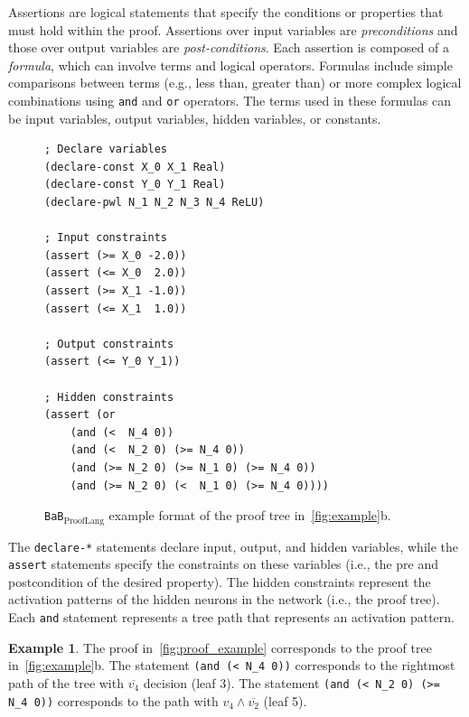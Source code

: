\documentclass[oneside,11pt,dvipsnames]{book}
\numberwithin{equation}{section}
\theoremstyle{definition}
\newtheorem{example}{Example}[section]
\theoremstyle{remark}
\newcommand{\functiontextformat}[1]{\textrm{\texttt{#1}}}
\newcommand{\tvn}[1]{\iftoggle{usecomment}{{\color{red}{[TVN]: #1}}}{}}
\newcommand{\hd}[1]{\iftoggle{usecomment}{{\color{blue}{[HD]: #1}}}{}}
\newcommand{\prooflang}{\texttt{BaB$_{\text{ProofLang}}$}}
\begin{document}
Assertions are logical statements that specify the conditions or properties that must hold within the proof. Assertions over input variables are \emph{preconditions} and those over output variables are \emph{post-conditions}. Each assertion is composed of a \textit{formula}, which can involve terms and logical operators. Formulas include simple comparisons between terms (e.g., less than, greater than) or more complex logical combinations using \functiontextformat{and} and \functiontextformat{or} operators. The terms used in these formulas can be input variables, output variables, hidden variables, or constants.

\begin{figure}
\begin{lstlisting}[style=SMTLIB-style, language=SMTLIB, basicstyle=\ttfamily\scriptsize]
; Declare variables
(declare-const X_0 X_1 Real)
(declare-const Y_0 Y_1 Real)
(declare-pwl N_1 N_2 N_3 N_4 ReLU)

; Input constraints
(assert (>= X_0 -2.0))
(assert (<= X_0  2.0))
(assert (>= X_1 -1.0))
(assert (<= X_1  1.0))

; Output constraints
(assert (<= Y_0 Y_1)) 

; Hidden constraints
(assert (or 
    (and (<  N_4 0))
    (and (<  N_2 0) (>= N_4 0))
    (and (>= N_2 0) (>= N_1 0) (>= N_4 0))
    (and (>= N_2 0) (<  N_1 0) (>= N_4 0))))
\end{lstlisting}
\caption{\prooflang{} example format of the proof tree in~\autoref{fig:example}b. 
}
\label{fig:proof_example}
\end{figure}


The \texttt{declare-*} statements declare input, output, and hidden variables, while the \texttt{assert} statements specify the constraints on these variables (i.e., the pre and postcondition of the desired property).
The hidden constraints represent the activation patterns of the hidden neurons in the network (i.e., the proof tree). Each \texttt{and} statement represents a tree path that represents an activation pattern. 



\begin{example} 
    The proof in~\autoref{fig:proof_example} corresponds to the proof tree in~\autoref{fig:example}b. The statement \texttt{(and (< N\_4 0))} corresponds to the rightmost path of the tree with $\overline{v_4}$ decision (leaf 3).  The statement \texttt{(and (< N\_2 0) (>= N\_4 0))} corresponds to the path with $v_4 \land \overline{v_2}$ (leaf 5). 
\end{example}
\end{document}
